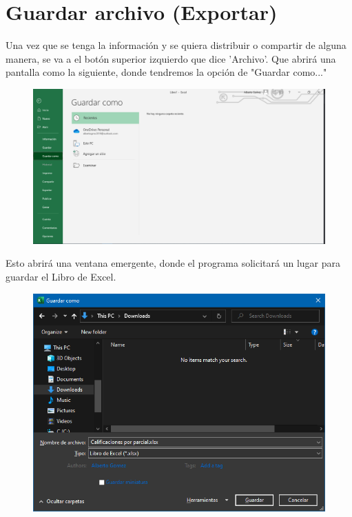 \documentclass[12pt,a4paper]{book}
\begin{document}
\section{Guardar archivo (Exportar)}
Una vez que se tenga la información y se quiera distribuir o compartir de alguna manera, se va a el botón superior izquierdo que dice 'Archivo'. Que abrirá una pantalla como la siguiente, donde tendremos la opción de "Guardar como..."
\begin{figure}[h]
	\centering
    \includegraphics[width=15cm]{excel14}
\end{figure}

Esto abrirá una ventana emergente, donde el programa solicitará un lugar para guardar el Libro de Excel.
\begin{figure}[h]
	\centering
    \includegraphics[width=13cm]{excel15}
\end{figure}
\newpage
\end{document}
